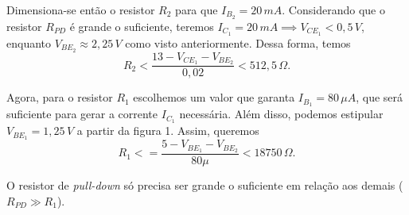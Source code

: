 \documentclass[a4paper]{report}
\begin{document}
Dimensiona-se então o resistor $R_2$ para que $I_{B_2}= 20\,mA$. Considerando que o resistor $R_{PD}$ é grande o suficiente, teremos $I_{C_1} = 20\,mA \implies V_{CE_1}<0,5\,V$, enquanto $V_{BE_2}\approx 2,25\,V$ como visto anteriormente. Dessa forma, temos \[
R_2 < \frac{13-V_{CE_1} - V_{BE_2}}{0,02} < 512,5\,\Omega
.\] 

Agora, para o resistor $R_1$ escolhemos um valor que garanta $I_{B_1} = 80\,\mu A$, que será suficiente para gerar a corrente $I_{C_1}$ necessária. Além disso, podemos estipular $V_{BE_1} = 1,25\,V$ a partir da figura 1. Assim, queremos \[
R_1 < = \frac{5 - V_{BE_1} - V_{BE_2}}{80\mu} < 18750\,\Omega
.\]

O resistor de \emph{pull-down} só precisa ser grande o suficiente em relação aos demais ($R_{PD} \gg R_1$).
\end{document}
